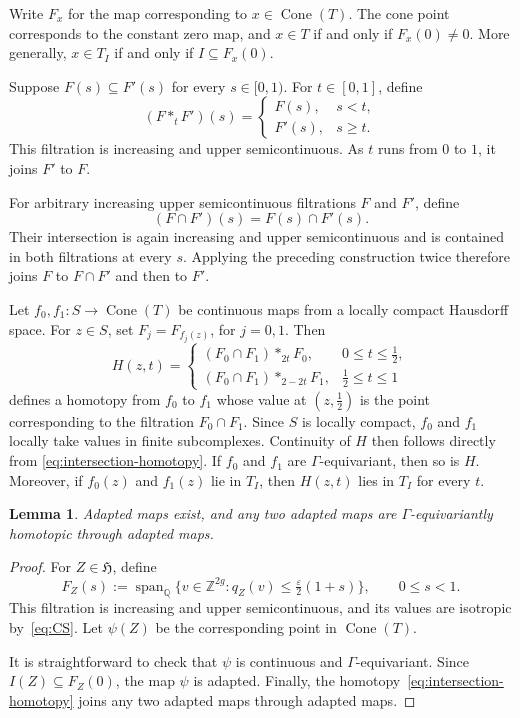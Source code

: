 \documentclass[12 pt]{amsart}
\newcommand{\fH}{\mathfrak H}
\newcommand{\QQ}{\mathbb{Q}}
\newcommand{\ZZ}{\mathbb{Z}}
\newcommand{\Cone}{\operatorname{Cone}}
\newcommand{\<}{\langle}
\renewcommand{\>}{\rangle}
\newtheorem{lemma}[theorem]{Lemma}
\theoremstyle{definition}
\begin{document}
Write $F_x$ for the map corresponding to $x \in \Cone(T)$. The cone point corresponds to the constant zero map, and $x \in T$ if and only if $F_x(0) \ne 0$. More generally, $x \in T_I$ if and only if $I \subseteq F_x(0)$.

Suppose $F(s) \subseteq F'(s)$ for every $s \in [0, 1)$. For $t \in [0, 1]$, define
\[
(F *_t F')(s) = \begin{cases}
F(s), & s < t,\\
F'(s), & s \geq t.
\end{cases}
\]
This filtration is increasing and upper semicontinuous. As $t$ runs from $0$ to $1$, it joins $F'$ to $F$.

For arbitrary increasing upper semicontinuous filtrations $F$ and $F'$, define
\[
(F \cap F')(s) = F(s) \cap F'(s).
\]
Their intersection is again increasing and upper semicontinuous and is contained in both filtrations at every $s$. Applying the preceding construction twice therefore joins $F$ to $F \cap F'$ and then to $F'$.

Let $f_0, f_1 \colon S \to \Cone(T)$ be continuous maps from a locally compact Hausdorff space. For $z \in S$, set $F_j = F_{f_j(z)}$, for $j = 0, 1$. Then
\begin{equation}\label{eq:intersection-homotopy}
H(z, t) = \begin{cases}
(F_0 \cap F_1) *_{2t} F_0, & 0 \leq t \leq \tfrac12,\\
(F_0 \cap F_1) *_{2 - 2t} F_1, & \tfrac12 \leq t \leq 1
\end{cases}
\end{equation}
defines a homotopy from $f_0$ to $f_1$ whose value at $(z, \tfrac12)$ is the point corresponding to the filtration $F_0 \cap F_1$. Since $S$ is locally compact, $f_0$ and $f_1$ locally take values in finite subcomplexes. Continuity of $H$ then follows directly from \eqref{eq:intersection-homotopy}. If $f_0$ and $f_1$ are $\Gamma$-equivariant, then so is $H$. Moreover, if $f_0(z)$ and $f_1(z)$ lie in $T_I$, then $H(z, t)$ lies in $T_I$ for every $t$.


\begin{lemma}\label{lem:adapted}
Adapted maps exist, and any two adapted maps are $\Gamma$-equivariantly homotopic through adapted maps.
\end{lemma}

\begin{proof}
For $Z \in \fH$, define
\[
F_Z(s) := \operatorname{span}_{\QQ} \{v \in \ZZ^{2g} : q_Z(v) \leq \tfrac{\varepsilon}{2}(1 + s)\}, \qquad 0 \leq s < 1.
\]
This filtration is increasing and upper semicontinuous, and its values are isotropic by~\eqref{eq:CS}. Let $\psi(Z)$ be the corresponding point in $\Cone(T)$.

It is straightforward to check that $\psi$ is continuous and $\Gamma$-equivariant. Since $I(Z) \subseteq F_Z(0)$, the map $\psi$ is adapted. Finally, the homotopy~\eqref{eq:intersection-homotopy} joins any two adapted maps through adapted maps.
\end{proof}
\end{document}
